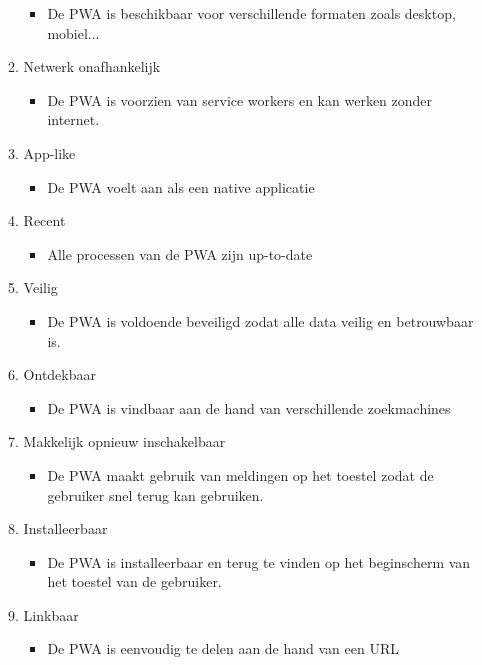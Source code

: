 \begin{itemize}
\begin{enumerate}
\begin{itemize}
           \item De PWA is beschikbaar voor verschillende formaten zoals desktop, mobiel...
       \end{itemize}
       \item Netwerk onafhankelijk
       \begin{itemize}
           \item De PWA is voorzien van service workers en kan werken zonder internet.
       \end{itemize}
       \item App-like
       \begin{itemize}
           \item De PWA voelt aan als een native applicatie
       \end{itemize}
       \item Recent
       \begin{itemize}
           \item Alle processen van de PWA zijn up-to-date 
       \end{itemize}
       \item Veilig
       \begin{itemize}
           \item De PWA is voldoende beveiligd zodat alle data veilig en betrouwbaar is.
       \end{itemize}
       \item Ontdekbaar
       \begin{itemize}
           \item De PWA is vindbaar aan de hand van verschillende zoekmachines
       \end{itemize}
       \item Makkelijk opnieuw inschakelbaar
       \begin{itemize}
           \item De PWA maakt gebruik van meldingen op het toestel zodat de gebruiker snel terug kan gebruiken.
       \end{itemize}
       \item Installeerbaar
       \begin{itemize}
           \item De PWA is installeerbaar en terug te vinden op het beginscherm van het toestel van de gebruiker.
       \end{itemize}
       \item Linkbaar
       \begin{itemize}
           \item De PWA is eenvoudig te delen aan de hand van een URL
       \end{itemize}
    \end{enumerate} 


\end{itemize}
